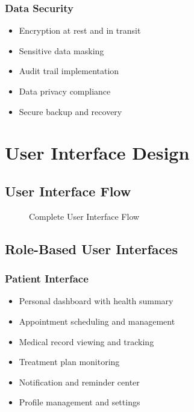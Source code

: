\documentclass[12pt,a4paper]{article}
\begin{document}
\subsubsection{Data Security}
\begin{itemize}
    \item Encryption at rest and in transit
    \item Sensitive data masking
    \item Audit trail implementation
    \item Data privacy compliance
    \item Secure backup and recovery
\end{itemize}

\section{User Interface Design}

\subsection{User Interface Flow}

\begin{figure}[H]
\centering
{}
\caption{Complete User Interface Flow}
\label{fig:complete-ui-flow}
\end{figure}

\subsection{Role-Based User Interfaces}

\subsubsection{Patient Interface}
\begin{itemize}
    \item Personal dashboard with health summary
    \item Appointment scheduling and management
    \item Medical record viewing and tracking
    \item Treatment plan monitoring
    \item Notification and reminder center
    \item Profile management and settings
\end{itemize}
\end{document}
